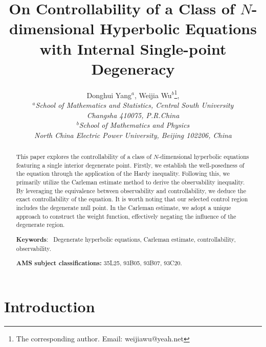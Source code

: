\documentclass[11pt]{article}
\numberwithin{equation}{section}
\def\bf{\textbf}
\begin{document}
		
		
		\title{\bf  {\bf On Controllability of  a Class of $N$-dimensional Hyperbolic Equations
				with Internal Single-point Degeneracy} }
		
		
		
		\author{Donghui Yang$^{a}$,  Weijia Wu$^{b}$\footnote{\small
				The corresponding author. Email: weijiawu@yeah.net},
			\\ $^a${\it School of Mathematics and Statistics, Central South University}\\
			{\it Changsha 410075, P.R.China} \\
			$^b${\it School of Mathematics and Physics}\\
			{\it North China Electric Power University, Beijing 102206, China}\\
			 		}
		\date{}
		
		\maketitle
		
		
		\begin{abstract}
			   This paper explores the controllability of a class of $N$-dimensional hyperbolic equations featuring a single interior degenerate point. Firstly, we establish the well-posedness of the equation through the application of the Hardy inequality. Following this, we primarily utilize the Carleman estimate method to derive the observability inequality. By leveraging the equivalence between observability and controllability, we deduce the exact controllability of the equation. It is worth noting that our selected control region includes the degenerate null point. In the Carleman estimate, we adopt a unique approach to construct the weight function, effectively negating the influence of the degenerate region.
			\vspace{0.2cm}
			
			{\bf{Keywords}:}~ Degenerate hyperbolic equations, Carleman estimate, controllability, observability.  \vspace{0.2cm}
			
			{\bf {\bf AMS subject classifications:}} 35L25, 93B05, 93B07, 93C20.
			
		\end{abstract}
		\thispagestyle{empty}		
		\section{Introduction}
		
\end{document}
